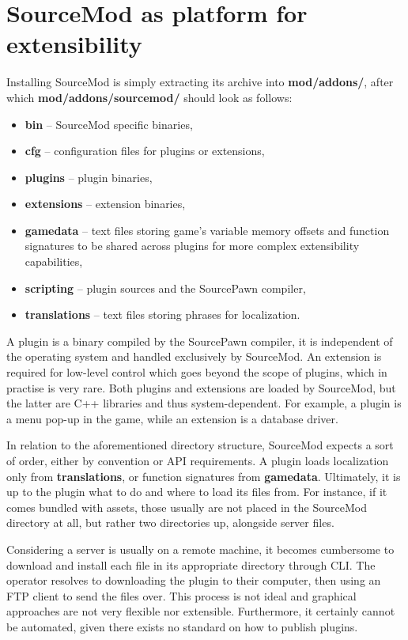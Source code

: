\section{SourceMod as platform for extensibility}

Installing SourceMod is simply extracting its archive into \textbf{mod/addons/}, after which \textbf{mod/addons/sourcemod/} should look as follows:
\begin{itemize}
    \item \textbf{bin} -- SourceMod specific binaries,
    \item \textbf{cfg} -- configuration files for plugins or extensions,
    \item \textbf{plugins} -- plugin binaries,
    \item \textbf{extensions} -- extension binaries,
    \item \textbf{gamedata} -- text files storing game's variable memory offsets and function signatures to be shared across plugins for more complex extensibility capabilities,
    \item \textbf{scripting} -- plugin sources and the SourcePawn compiler,
    \item \textbf{translations} -- text files storing phrases for localization.
\end{itemize}

A plugin is a binary compiled by the SourcePawn compiler, it is independent of the operating system and handled exclusively by SourceMod.
An extension is required for low-level control which goes beyond the scope of plugins, which in practise is very rare.
Both plugins and extensions are loaded by SourceMod, but the latter are C++ libraries and thus system-dependent.
For example, a plugin is a menu pop-up in the game, while an extension is a database driver.

In relation to the aforementioned directory structure, SourceMod expects a sort of order, either by convention or API requirements.
A plugin loads localization only from \textbf{translations}, or function signatures from \textbf{gamedata}.
Ultimately, it is up to the plugin what to do and where to load its files from.
For instance, if it comes bundled with assets, those usually are not placed in the SourceMod directory at all, but rather two directories up, alongside server files.

Considering a server is usually on a remote machine, it becomes cumbersome to download and install each file in its appropriate directory through CLI.
The operator resolves to downloading the plugin to their computer, then using an FTP client to send the files over.
This process is not ideal and graphical approaches are not very flexible nor extensible.
Furthermore, it certainly cannot be automated, given there exists no standard on how to publish plugins.


